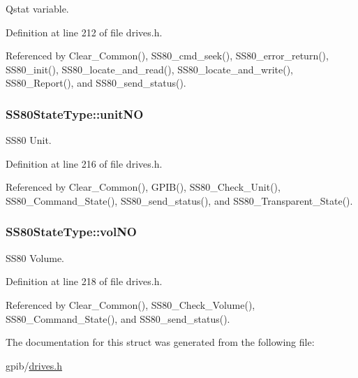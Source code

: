 Qstat variable. 



Definition at line 212 of file drives.\+h.



Referenced by Clear\+\_\+\+Common(), S\+S80\+\_\+cmd\+\_\+seek(), S\+S80\+\_\+error\+\_\+return(), S\+S80\+\_\+init(), S\+S80\+\_\+locate\+\_\+and\+\_\+read(), S\+S80\+\_\+locate\+\_\+and\+\_\+write(), S\+S80\+\_\+\+Report(), and S\+S80\+\_\+send\+\_\+status().

\subsubsection[{\texorpdfstring{unit\+NO}{unitNO}}]{ S\+S80\+State\+Type\+::unit\+NO}\hypertarget{structSS80StateType_ad2b3cd5353f5650df931520a39b385e7}{}\label{structSS80StateType_ad2b3cd5353f5650df931520a39b385e7}


S\+S80 Unit. 



Definition at line 216 of file drives.\+h.



Referenced by Clear\+\_\+\+Common(), G\+P\+I\+B(), S\+S80\+\_\+\+Check\+\_\+\+Unit(), S\+S80\+\_\+\+Command\+\_\+\+State(), S\+S80\+\_\+send\+\_\+status(), and S\+S80\+\_\+\+Transparent\+\_\+\+State().

\subsubsection[{\texorpdfstring{vol\+NO}{volNO}}]{ S\+S80\+State\+Type\+::vol\+NO}\hypertarget{structSS80StateType_ac197866db7677ec4bf9ad5e29e4a58a3}{}\label{structSS80StateType_ac197866db7677ec4bf9ad5e29e4a58a3}


S\+S80 Volume. 



Definition at line 218 of file drives.\+h.



Referenced by Clear\+\_\+\+Common(), S\+S80\+\_\+\+Check\+\_\+\+Volume(), S\+S80\+\_\+\+Command\+\_\+\+State(), and S\+S80\+\_\+send\+\_\+status().



The documentation for this struct was generated from the following file\+:\begin{DoxyCompactItemize}
\item 
gpib/\hyperlink{drives_8h}{drives.\+h}\end{DoxyCompactItemize}
